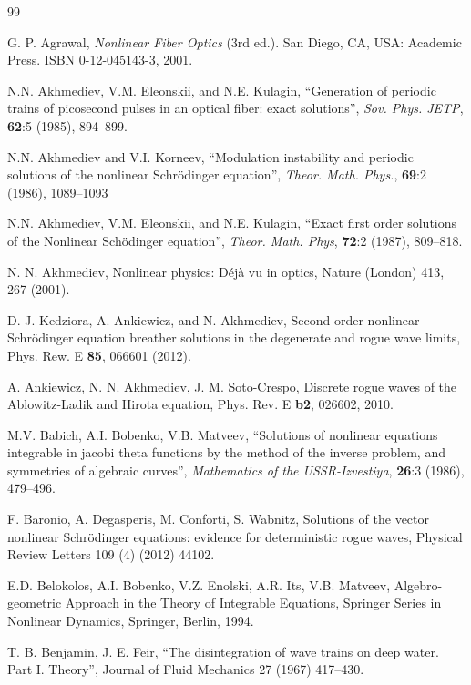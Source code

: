 \documentclass[12pt]{article}
\begin{document}
\begin{thebibliography}{99}

 G. P. Agrawal, {\it Nonlinear Fiber Optics} (3rd ed.). San Diego, CA, USA: Academic Press. ISBN 0-12-045143-3, 2001.


 N.N. Akhmediev, V.M. Eleonskii, and N.E. Kulagin, ``Generation of periodic trains of picosecond pulses in an optical fiber: exact solutions'', \textit{Sov. Phys. JETP}, \textbf{62}:5 (1985), 894--899.  

 N.N. Akhmediev and V.I. Korneev, ``Modulation instability and periodic solutions of the nonlinear Schrödinger equation'', \textit{Theor. Math. Phys.}, \textbf{69}:2 (1986), 1089--1093

 N.N. Akhmediev, V.M. Eleonskii, and N.E. Kulagin, ``Exact first order solutions of the Nonlinear Sch\"odinger equation'', \textit{Theor. Math. Phys}, \textbf{72}:2 (1987), 809--818.

 N. N. Akhmediev, Nonlinear physics: D\'ej\`a vu in optics, Nature (London) 413, 267 (2001).

 D. J. Kedziora, A. Ankiewicz, and N. Akhmediev, Second-order nonlinear Schr\"odinger equation breather solutions in the degenerate and rogue wave limits, Phys. Rew. E {\bf 85}, 066601 (2012).

 A. Ankiewicz, N. N. Akhmediev, J. M. Soto-Crespo, Discrete rogue waves of the Ablowitz-Ladik and Hirota equation, Phys. Rev. E {\bf b2}, 026602, 2010.  

  M.V. Babich, A.I. Bobenko, V.B. Matveev, ``Solutions of nonlinear equations integrable in jacobi theta functions by the method of the inverse problem, and symmetries of algebraic curves'',  \textit{Mathematics of the USSR-Izvestiya}, \textbf{26}:3 (1986), 479--496. 

 F. Baronio, A. Degasperis, M. Conforti, S. Wabnitz, Solutions of the vector nonlinear Schrödinger equations: evidence for deterministic rogue waves, Physical Review Letters 109 (4) (2012) 44102.

 E.D. Belokolos, A.I. Bobenko, V.Z. Enolski, A.R. Its, V.B. Matveev, Algebro-geometric Approach in the Theory of Integrable Equations, Springer Series in Nonlinear Dynamics, Springer, Berlin, 1994. 

 T. B. Benjamin, J. E. Feir, ``The disintegration of wave trains on deep water. Part I. Theory'', Journal of Fluid Mechanics 27 (1967) 417--430.


\end{thebibliography}
\end{document}
